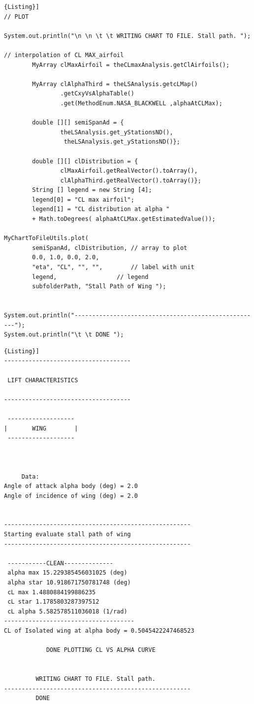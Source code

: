 \begin{lstlisting}[frame=rbl,caption={{\footnotesize Lift Characteristics of a Lifting Surface - Test Class}},label= [style=\bfseries]{Listing}]
// PLOT

System.out.println("\n \n \t \t WRITING CHART TO FILE. Stall path. ");

// interpolation of CL MAX_airfoil
		MyArray clMaxAirfoil = theCLmaxAnalysis.getClAirfoils();

		MyArray clAlphaThird = theLSAnalysis.getcLMap()
				.getCxyVsAlphaTable()
				.get(MethodEnum.NASA_BLACKWELL ,alphaAtCLMax);

		double [][] semiSpanAd = {
				theLSAnalysis.get_yStationsND(),
				 theLSAnalysis.get_yStationsND()};

		double [][] clDistribution = {
				clMaxAirfoil.getRealVector().toArray(), 
				clAlphaThird.getRealVector().toArray()};
		String [] legend = new String [4];
		legend[0] = "CL max airfoil";
		legend[1] = "CL distribution at alpha " 
		+ Math.toDegrees( alphaAtCLMax.getEstimatedValue());

MyChartToFileUtils.plot(
		semiSpanAd,	clDistribution, // array to plot
		0.0, 1.0, 0.0, 2.0,					
		"eta", "CL", "", "",	    // label with unit
		legend,					// legend
		subfolderPath, "Stall Path of Wing ");			


System.out.println("-----------------------------------------------------");
System.out.println("\t \t DONE ");

\end{lstlisting}


\begin{lstlisting}[caption={{\footnotesize Lift Characteristics of a Lifting Surface - Results. ATR-72}},label= [style=\bfseries]{Listing}]
------------------------------------

 LIFT CHARACTERISTICS  

------------------------------------

 ------------------- 
|       WING        |
 ------------------- 



 	 Data: 
Angle of attack alpha body (deg) = 2.0
Angle of incidence of wing (deg) = 2.0

 
-----------------------------------------------------
Starting evaluate stall path of wing
-----------------------------------------------------

 -----------CLEAN-------------- 
 alpha max 15.229385456031025 (deg)
 alpha star 10.918671750781748 (deg)
 cL max 1.4880884199886235
 cL star 1.1785803287397512
 cL alpha 5.582578511036018 (1/rad)
-------------------------------------
CL of Isolated wing at alpha body = 0.5045422247468523

 	 	 	DONE PLOTTING CL VS ALPHA CURVE  

 
 	 	 WRITING CHART TO FILE. Stall path. 
-----------------------------------------------------
	 	 DONE 
\end{lstlisting}


